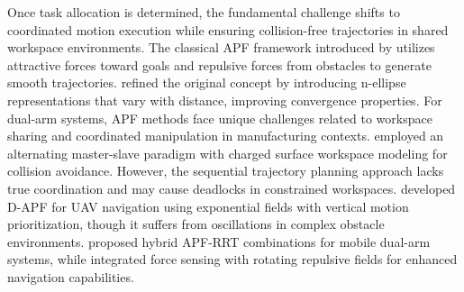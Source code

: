\documentclass[pdflatex,sn-mathphys-num]{sn-jnl}%
\theoremstyle{thmstyleone}%
\theoremstyle{thmstylethree}%
\begin{document}
Once task allocation is determined, the fundamental challenge shifts to coordinated motion execution while ensuring collision-free trajectories in shared workspace environments\cite{vahrenkamp2009humanoid}. The classical APF framework introduced by \cite{motionplanning_1} utilizes attractive forces toward goals and repulsive forces from obstacles to generate smooth trajectories. \cite{motionplanning_2,liu2024} refined the original concept by introducing n-ellipse representations that vary with distance, improving convergence properties. For dual-arm systems, APF methods face unique challenges related to workspace sharing and coordinated manipulation in manufacturing contexts. \cite{motionplanning_3} employed an alternating master-slave paradigm with charged surface workspace modeling for collision avoidance. However, the sequential trajectory planning approach lacks true coordination and may cause deadlocks in constrained workspaces. \cite{motionplanning_4} developed D-APF for UAV navigation using exponential fields with vertical motion prioritization, though it suffers from oscillations in complex obstacle environments. \cite{motionplanning_5} proposed hybrid APF-RRT combinations for mobile dual-arm systems, while \cite{motionplanning_6} integrated force sensing with rotating repulsive fields for enhanced navigation capabilities. 
\end{document}
